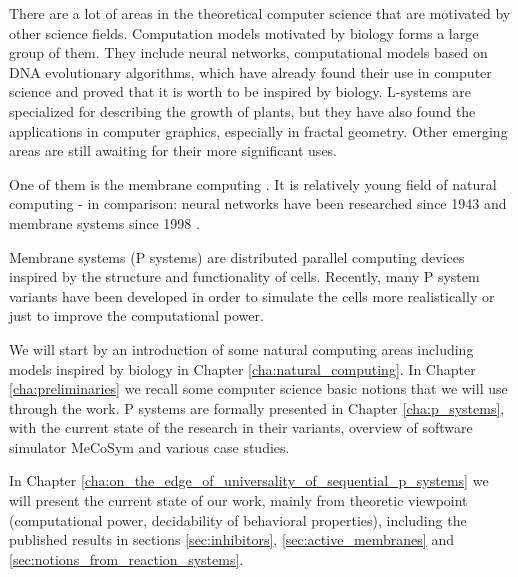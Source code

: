 
There are a lot of areas in the theoretical computer science that are motivated by other science fields. Computation models motivated by biology forms a large group of them. They include neural networks, computational models based on DNA evolutionary algorithms, which have already found their use in computer science and proved that it is worth to be inspired by biology. L-systems are specialized for describing the growth of plants, but they have also found the applications in computer graphics, especially in fractal geometry. Other emerging areas are still awaiting for their more significant uses.

One of them is the membrane computing \cite{Paun10OxfordHandbookMembraneComputing}. It is relatively young field of natural computing - in comparison: neural networks have been researched since 1943 and membrane systems since 1998 \cite{Paun98}.

Membrane systems (P systems) are distributed parallel computing devices inspired by the structure and functionality of cells. Recently, many P system variants have been developed in order to simulate the cells more realistically or just to improve the computational power.

We will start by an introduction of some natural computing areas including models inspired by biology in Chapter \ref{cha:natural_computing}. In Chapter \ref{cha:preliminaries} we recall some computer science basic notions that we will use through the work. P systems are formally presented in Chapter \ref{cha:p_systems}, with the current state of the research in their variants, overview of software simulator MeCoSym and various case studies.

In Chapter \ref{cha:on_the_edge_of_universality_of_sequential_p_systems} we will present the current state of our work, mainly from theoretic viewpoint (computational power, decidability of behavioral properties), including the published results in sections \ref{sec:inhibitors}, \ref{sec:active_membranes} and \ref{sec:notions_from_reaction_systems}.
